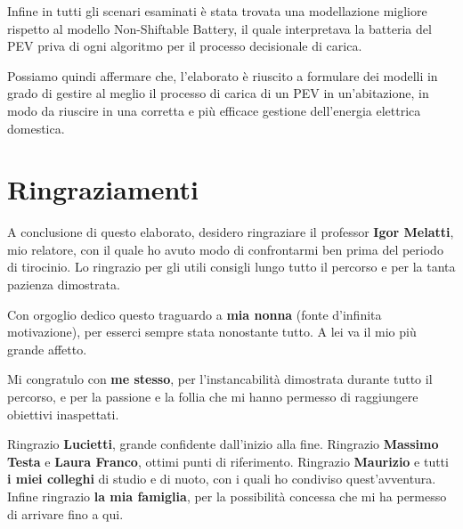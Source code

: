 \documentclass[italian, Lau, oneside]{sapthesis}
\begin{document}
Infine in tutti gli scenari esaminati è stata trovata una modellazione migliore rispetto al modello Non-Shiftable Battery, il quale interpretava la batteria del PEV priva di ogni algoritmo per il processo decisionale di carica.

Possiamo quindi affermare che, l'elaborato è riuscito a formulare dei modelli in grado di gestire al meglio il processo di carica di un PEV in un'abitazione, in modo da riuscire in una corretta e più efficace gestione dell'energia elettrica domestica.








\chapter*{Ringraziamenti}
A conclusione di questo elaborato, desidero ringraziare il professor \textbf{Igor Melatti}, mio relatore, con il quale ho avuto modo di confrontarmi ben prima del periodo di tirocinio. Lo ringrazio per gli utili consigli lungo tutto il percorso e per la tanta pazienza dimostrata.

Con orgoglio dedico questo traguardo a \textbf{mia nonna} (fonte d'infinita motivazione), per esserci sempre stata nonostante tutto. A lei va il mio più grande affetto. 

Mi congratulo con \textbf{me stesso}, per l'instancabilità dimostrata durante tutto il percorso, e per la passione e la follia che mi hanno permesso di raggiungere obiettivi inaspettati.

Ringrazio \textbf{Lucietti}, grande confidente dall'inizio alla fine. Ringrazio \textbf{Massimo Testa} e \textbf{Laura Franco}, ottimi punti di riferimento. Ringrazio \textbf{Maurizio} e tutti \textbf{i miei colleghi} di studio e di nuoto, con i quali ho condiviso quest'avventura. Infine ringrazio \textbf{la mia famiglia}, per la possibilità concessa che mi ha permesso di arrivare fino a qui.
\backmatter
{}
\end{document}
